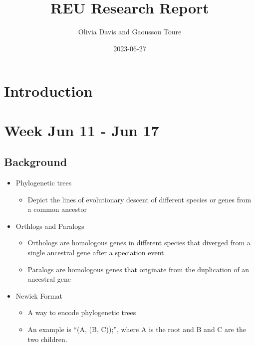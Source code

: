 \documentclass[
  11pt,
  letterpaper,
  oneside]{book}
\title{REU Research Report}
\author{Olivia Davis and Gaoussou Toure}
\date{2023-06-27}
\providecommand{\tightlist}{%
  \setlength{\itemsep}{0pt}\setlength{\parskip}{0pt}}\usepackage{longtable,booktabs,array}
\renewcommand*\contentsname{Table of contents}
\newcommand\contentsname{Table of contents}
\begin{document}
\frontmatter
\maketitle
\ifdefined\Shaded\renewenvironment{Shaded}{\begin{tcolorbox}[colback={codebgcolor}, enhanced, borderline west={3pt}{0pt}{shadecolor}, boxrule=0pt, sharp corners, frame hidden, breakable]}{\end{tcolorbox}}\fi

\renewcommand*\contentsname{Contents}
{
\hypersetup{linkcolor=}
\setcounter{tocdepth}{4}
\tableofcontents
}
\mainmatter
{}

\hypertarget{introduction}{%
\chapter*{Introduction}\label{introduction}}



\hypertarget{week-jun-11---jun-17}{%
\chapter{Week Jun 11 - Jun 17}\label{week-jun-11---jun-17}}

\hypertarget{background}{%
\section{Background}\label{background}}

\begin{itemize}
\tightlist
\item
  Phylogenetic trees

  \begin{itemize}
  \tightlist
  \item
    Depict the lines of evolutionary descent of different species or
    genes from a common ancestor
  \end{itemize}
\item
  Orthlogs and Paralogs

  \begin{itemize}
  \tightlist
  \item
    Orthologs are homologous genes in different species that diverged
    from a single ancestral gene after a speciation event
  \item
    Paralogs are homologous genes that originate from the duplication of
    an ancestral gene
  \end{itemize}
\item
  Newick Format

  \begin{itemize}
  \tightlist
  \item
    A way to encode phylogenetic trees
  \item
    An example is ``(A, (B, C));'', where A is the root and B and C are
    the two children.
  \end{itemize}
\end{itemize}
\end{document}

